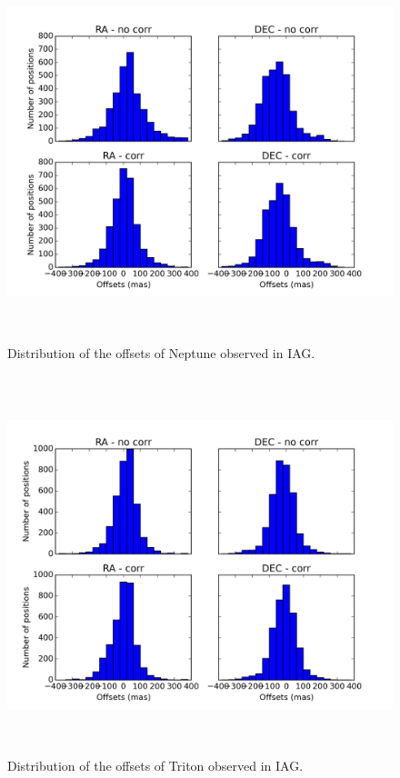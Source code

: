 \documentclass[12pt,a4paper]{report}
\begin{document}
\begin{figure}[h]
\centering
\includegraphics[height=11.0cm]{dist_Netuno_IAG.png} 
\caption{Distribution of the offsets of Neptune observed in IAG.}
\label{Fig:refraction-net-iag}
\end{figure}
\begin{figure}[h]
\centering
\includegraphics[height=11.0cm]{dist_Triton_IAG.png} 
\caption{Distribution of the offsets of Triton observed in IAG.}
\label{Fig:refraction-tri-iag}
\end{figure}
\end{document}
